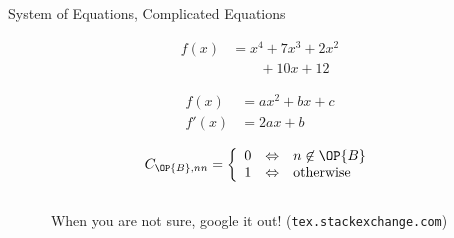 \documentclass[xcolor=dvipsnames, aspectratio=169, handout, intlimits]{beamer}
\providecommand{\setB}{\ensuremath{\OP{B}}}
\begin{document}
\begin{frame}{System of Equations, Complicated Equations}

\vspace{-0.75cm}
\begin{align}
f(x) &= x^4 + 7x^3 + 2x^2 \nonumber \\
&\qquad {} + 10x + 12
\end{align}

\vspace{-0.5cm}
\begin{align}
f(x)  &= a x^2+b x +c \\
f'(x) &= 2 a x +b
\end{align}

\vspace{-0.2cm}
\begin{equation*}
C_{\setB,nn} = \left\{
\begin{array}{lll}
0 & \Leftrightarrow & n \not\in \setB \\
1 & \Leftrightarrow & \mathrm{otherwise} \\
\end{array}
\right.
\end{equation*}

\begin{columns}
\begin{column}{0.1\textwidth}	
	
\end{column}
\begin{column}{0.8\textwidth}
	\begin{block}{}
		\centering
		When you are not sure, google it out! (\texttt{tex.stackexchange.com})
	\end{block}			
\end{column}
\begin{column}{0.1\textwidth}
	
\end{column}		
\end{columns}

\end{frame}
\end{document}
